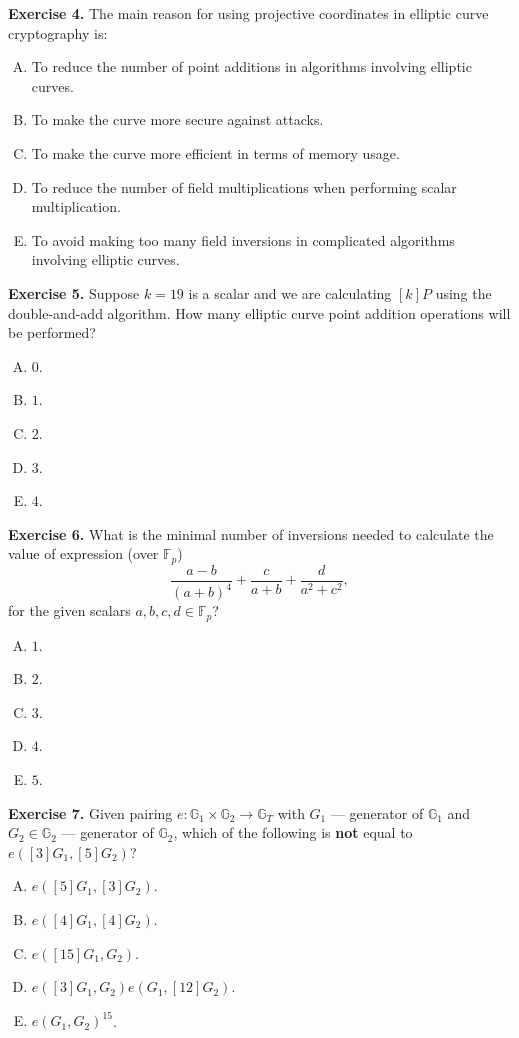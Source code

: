 \documentclass[../lecture-notes.tex]{subfiles}
\begin{document}
\textbf{Exercise 4.} The main reason for using projective coordinates in elliptic curve cryptography is:
\begin{enumerate}[(A)]
    \item To reduce the number of point additions in algorithms involving elliptic curves.
    \item To make the curve more secure against attacks.
    \item To make the curve more efficient in terms of memory usage.
    \item To reduce the number of field multiplications when performing scalar multiplication.
    \item To avoid making too many field inversions in complicated algorithms involving elliptic curves.
\end{enumerate}

\textbf{Exercise 5.} Suppose $k=19$ is a scalar and we are calculating $[k]P$ using the double-and-add algorithm. How many elliptic curve point addition operations will be performed?
\begin{enumerate}[(A)]
    \item $0$.
    \item $1$.
    \item $2$.
    \item $3$.
    \item $4$.
\end{enumerate}

\textbf{Exercise 6.} What is the minimal number of inversions needed to calculate the value of expression (over $\mathbb{F}_p$)
\begin{equation*}
    \frac{a-b}{(a+b)^4} + \frac{c}{a+b} + \frac{d}{a^2+c^2},
\end{equation*}
for the given scalars $a,b,c,d \in \mathbb{F}_p$?
\begin{enumerate}[(A)]
    \item $1$.
    \item $2$.
    \item $3$.
    \item $4$.
    \item $5$.
\end{enumerate}

\textbf{Exercise 7.} Given pairing $e: \mathbb{G}_1 \times \mathbb{G}_2 \to \mathbb{G}_T$ with $G_1$ --- generator of $\mathbb{G}_1$ and $G_2 \in \mathbb{G}_2$ --- generator of $\mathbb{G}_2$, which of the following is \textbf{not} equal to $e([3]G_1, [5]G_2)$?
\begin{enumerate}[(A)]
    \item $e([5]G_1, [3]G_2)$.
    \item $e([4]G_1, [4]G_2)$.
    \item $e([15]G_1, G_2)$.
    \item $e([3]G_1,G_2)e(G_1,[12]G_2)$.
    \item $e(G_1, G_2)^{15}$.
\end{enumerate} 
\end{document}
